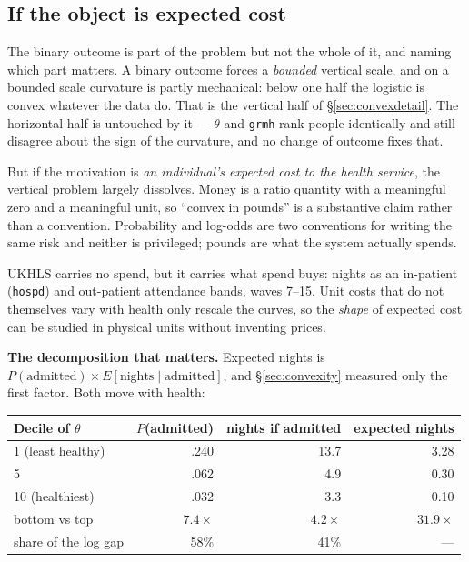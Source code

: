 \documentclass[11pt]{article}
\newcommand{\code}[1]{\texttt{\small #1}}
\begin{document}
\subsection{If the object is expected cost}
\label{sec:expcost}

The binary outcome is part of the problem but not the whole of it, and
naming which part matters. A binary outcome forces a \emph{bounded} vertical
scale, and on a bounded scale curvature is partly mechanical: below one half
the logistic is convex whatever the data do. That is the vertical half of
\S\ref{sec:convexdetail}. The horizontal half is untouched by it --- $\theta$
and \code{grmh} rank people identically and still disagree about the sign of
the curvature, and no change of outcome fixes that.

But if the motivation is \emph{an individual's expected cost to the health
service}, the vertical problem largely dissolves. Money is a ratio quantity
with a meaningful zero and a meaningful unit, so ``convex in pounds'' is a
substantive claim rather than a convention. Probability and log-odds are two
conventions for writing the same risk and neither is privileged; pounds are
what the system actually spends.

UKHLS carries no spend, but it carries what spend buys: nights as an
in-patient (\code{hospd}) and out-patient attendance bands, waves 7--15. Unit
costs that do not themselves vary with health only rescale the curves, so the
\emph{shape} of expected cost can be studied in physical units without
inventing prices.

\textbf{The decomposition that matters.} Expected nights is
$P(\text{admitted}) \times E[\text{nights} \mid \text{admitted}]$, and
\S\ref{sec:convexity} measured only the first factor. Both move with health:

\begin{center}\small
\begin{tabular}{lrrr}
\toprule
Decile of $\theta$ & $P$(admitted) & nights if admitted & expected nights \\
\midrule
1 (least healthy) & .240 & 13.7 & 3.28 \\
5 & .062 & 4.9 & 0.30 \\
10 (healthiest) & .032 & 3.3 & 0.10 \\
\midrule
bottom vs top & $7.4\times$ & $4.2\times$ & $\mathbf{31.9\times}$ \\
share of the log gap & 58\% & 41\% & --- \\
\bottomrule
\end{tabular}
\end{center}
\end{document}
